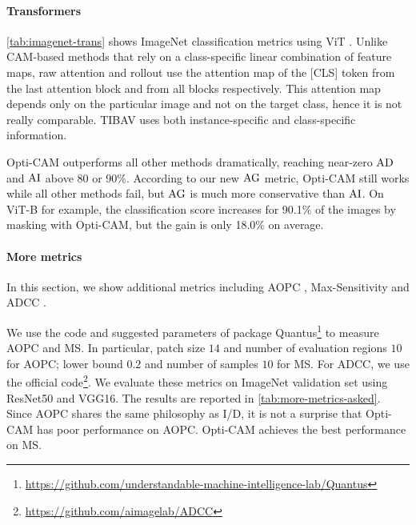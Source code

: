 

\paragraph{Transformers}

\autoref{tab:imagenet-trans} shows ImageNet classification metrics using ViT . 
Unlike CAM-based methods that rely on a class-specific linear combination of feature maps, 
raw attention \autocite{dosovitskiy2020image} and rollout \autocite{abnar2020quantifying} use the 
attention map of the [CLS] token from the last attention block and from all blocks respectively. 
This attention map depends only on the particular image and not on the target class, hence it 
is not really comparable. TIBAV \autocite{chefer2021transformer} uses both instance-specific and 
class-specific information.

Opti-CAM outperforms all other methods dramatically, reaching near-zero $\operatorname{AD}$ and $\operatorname{AI}$ above 80 or 
90\%. According to our new $\operatorname{AG}$ metric, Opti-CAM still works while all other methods fail, 
but $\operatorname{AG}$ is much more conservative than $\operatorname{AI}$. On ViT-B for example, the classification score 
increases for 90.1\% of the images by masking with Opti-CAM, but the gain is only 18.0\% on average.

\paragraph{More metrics}
In this section, we show additional metrics including AOPC \autocite{samek2016evaluating}, Max-Sensitivity
\autocite{yeh2019fidelity} and ADCC \autocite{poppi2021revisiting}.

We use the code and suggested parameters of package 
Quantus\footnote{\url{https://github.com/understandable-machine-intelligence-lab/Quantus}} to measure AOPC 
and MS. In particular, patch size $14$ and number of evaluation regions $10$ for AOPC; lower bound $0.2$ 
and number of samples $10$ for MS.
For ADCC, we use the official 
code\footnote{\url{https://github.com/aimagelab/ADCC}}.
We evaluate these metrics on ImageNet validation set using ResNet50 and VGG16. The results are 
reported in \autoref{tab:more-metrics-asked}. Since AOPC shares the same philosophy as I/D, it is 
not a surprise that Opti-CAM has poor performance on AOPC. Opti-CAM achieves the best performance on MS.


